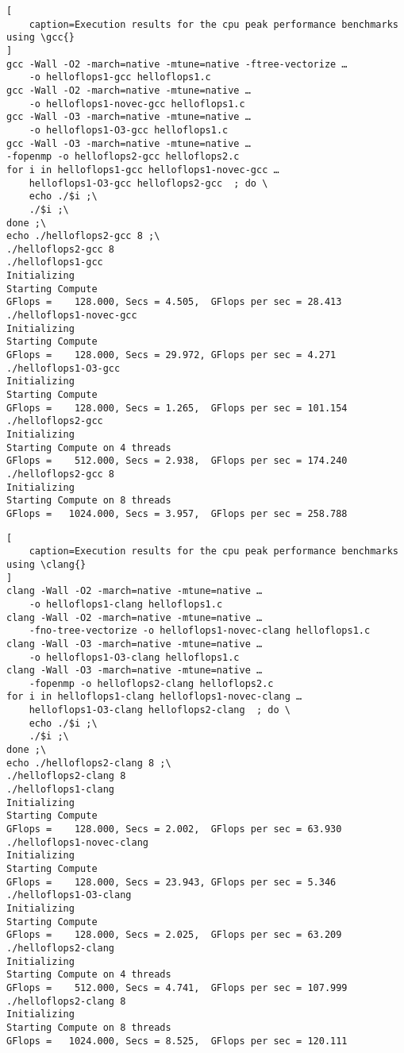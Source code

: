 \documentclass[
    12pt, %
]{fphw}
\newcommand{\gcc}{\textit{gcc}}
\newcommand{\clang}{\textit{clang}}
\begin{document}
\begin{lstlisting}[
    caption=Execution results for the cpu peak performance benchmarks using \gcc{}
]
gcc -Wall -O2 -march=native -mtune=native -ftree-vectorize …
    -o helloflops1-gcc helloflops1.c
gcc -Wall -O2 -march=native -mtune=native …
    -o helloflops1-novec-gcc helloflops1.c
gcc -Wall -O3 -march=native -mtune=native …
    -o helloflops1-O3-gcc helloflops1.c
gcc -Wall -O3 -march=native -mtune=native …
-fopenmp -o helloflops2-gcc helloflops2.c
for i in helloflops1-gcc helloflops1-novec-gcc …
    helloflops1-O3-gcc helloflops2-gcc  ; do \
	echo ./$i ;\
	./$i ;\
done ;\
echo ./helloflops2-gcc 8 ;\
./helloflops2-gcc 8
./helloflops1-gcc
Initializing
Starting Compute
GFlops =    128.000, Secs = 4.505,  GFlops per sec = 28.413
./helloflops1-novec-gcc
Initializing
Starting Compute
GFlops =    128.000, Secs = 29.972, GFlops per sec = 4.271
./helloflops1-O3-gcc
Initializing
Starting Compute
GFlops =    128.000, Secs = 1.265,  GFlops per sec = 101.154
./helloflops2-gcc
Initializing
Starting Compute on 4 threads
GFlops =    512.000, Secs = 2.938,  GFlops per sec = 174.240
./helloflops2-gcc 8
Initializing
Starting Compute on 8 threads
GFlops =   1024.000, Secs = 3.957,  GFlops per sec = 258.788
\end{lstlisting}

\begin{lstlisting}[
    caption=Execution results for the cpu peak performance benchmarks using \clang{}
]
clang -Wall -O2 -march=native -mtune=native …
    -o helloflops1-clang helloflops1.c
clang -Wall -O2 -march=native -mtune=native …
    -fno-tree-vectorize -o helloflops1-novec-clang helloflops1.c
clang -Wall -O3 -march=native -mtune=native …
    -o helloflops1-O3-clang helloflops1.c
clang -Wall -O3 -march=native -mtune=native …
    -fopenmp -o helloflops2-clang helloflops2.c
for i in helloflops1-clang helloflops1-novec-clang …
    helloflops1-O3-clang helloflops2-clang  ; do \
	echo ./$i ;\
	./$i ;\
done ;\
echo ./helloflops2-clang 8 ;\
./helloflops2-clang 8
./helloflops1-clang
Initializing
Starting Compute
GFlops =    128.000, Secs = 2.002,  GFlops per sec = 63.930
./helloflops1-novec-clang
Initializing
Starting Compute
GFlops =    128.000, Secs = 23.943, GFlops per sec = 5.346
./helloflops1-O3-clang
Initializing
Starting Compute
GFlops =    128.000, Secs = 2.025,  GFlops per sec = 63.209
./helloflops2-clang
Initializing
Starting Compute on 4 threads
GFlops =    512.000, Secs = 4.741,  GFlops per sec = 107.999
./helloflops2-clang 8
Initializing
Starting Compute on 8 threads
GFlops =   1024.000, Secs = 8.525,  GFlops per sec = 120.111
\end{lstlisting}
\end{document}
